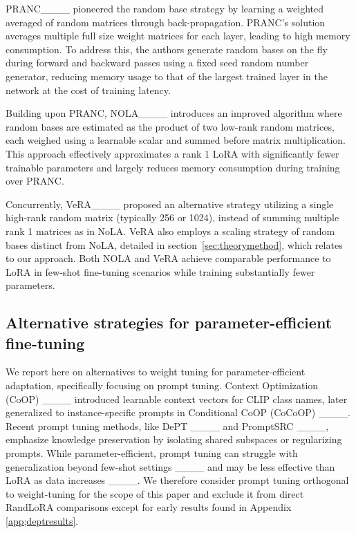 PRANC____ pioneered the random base strategy by learning a weighted averaged of random matrices through back-propagation. PRANC's solution averages multiple full size weight matrices for each layer, leading to high memory consumption. To address this, the authors generate random bases on the fly during forward and backward passes using a fixed seed random number generator, reducing memory usage to that of the largest trained layer in the network at the cost of training latency.

Building upon PRANC, NOLA____ introduces an improved algorithm where random bases are estimated as the product of two low-rank random matrices, each weighed using a learnable scalar and summed before matrix multiplication. This approach effectively approximates a rank 1 LoRA with significantly fewer trainable parameters and largely reduces memory consumption during training over PRANC.

Concurrently, VeRA____ proposed an alternative strategy utilizing a single high-rank random matrix (typically 256 or 1024), instead of summing multiple rank 1 matrices as in NoLA. VeRA also employs a scaling strategy of random bases distinct from NoLA, detailed in section~\ref{sec:theorymethod}, which relates to our approach. Both NOLA and VeRA achieve comparable performance to LoRA in few-shot fine-tuning scenarios while training substantially fewer parameters.

\subsection{Alternative strategies for parameter-efficient fine-tuning}
We report here on alternatives to weight tuning for parameter-efficient adaptation, specifically focusing on prompt tuning.  Context Optimization (CoOP) ____ introduced learnable context vectors for CLIP class names, later generalized to instance-specific prompts in Conditional CoOP (CoCoOP) ____. Recent prompt tuning methods, like DePT ____ and PromptSRC ____, emphasize knowledge preservation by isolating shared subspaces or regularizing prompts.  While parameter-efficient, prompt tuning can struggle with generalization beyond few-shot settings ____ and may be less effective than LoRA as data increases ____. We therefore consider prompt tuning orthogonal to weight-tuning for the scope of this paper and exclude it from direct RandLoRA comparisons except for early results found in Appendix \ref{app;deptresults}.